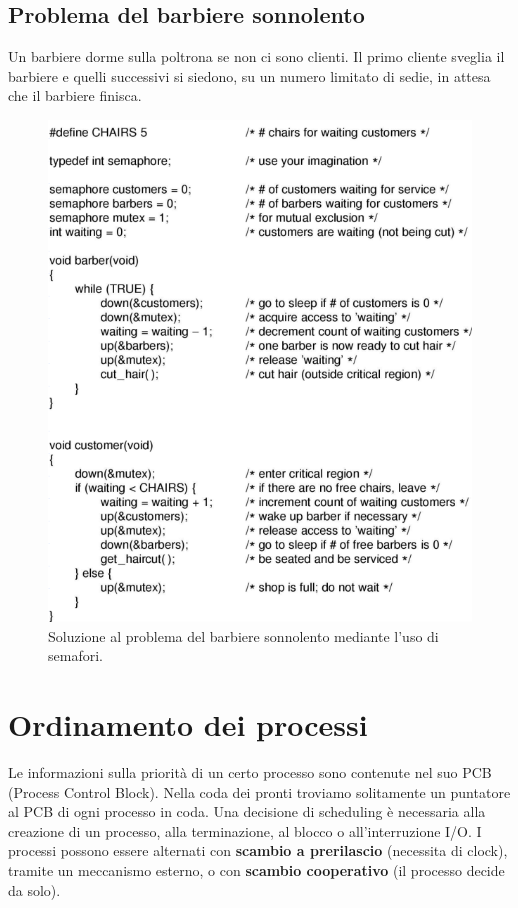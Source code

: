 \documentclass{article}
\begin{document}
\subsection{Problema del barbiere sonnolento} Un barbiere dorme sulla poltrona se non ci sono clienti. Il primo cliente sveglia il barbiere e quelli successivi si siedono, su un numero limitato di sedie, in attesa che il barbiere finisca.

\begin{figure}[H]
    \centering
    \includegraphics[scale=0.5]{barb.png}
    \caption{Soluzione al problema del barbiere sonnolento mediante l'uso di semafori.}
    \label{fig:barb}
\end{figure}

\section{Ordinamento dei processi} Le informazioni sulla priorità di un certo processo sono contenute nel suo PCB (Process Control Block). Nella coda dei pronti troviamo solitamente un puntatore al PCB di ogni processo in coda. Una decisione di scheduling è necessaria alla creazione di un processo, alla terminazione, al blocco o all'interruzione I/O. I processi possono essere alternati con \textbf{scambio a prerilascio} (necessita di clock), tramite un meccanismo esterno, o con \textbf{scambio cooperativo} (il processo decide da solo).
\end{document}
